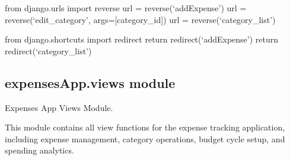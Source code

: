 \documentclass[letterpaper,10pt,english]{sphinxmanual}
\begin{document}
\begin{fulllineitems}
\begin{description}
\sphinxAtStartPar
from django.urls import reverse
url = reverse(‘addExpense’)
url = reverse(‘edit\_category’, args={[}category\_id{]})
url = reverse(‘category\_list’)

\sphinxAtStartPar
from django.shortcuts import redirect
return redirect(‘addExpense’)
return redirect(‘category\_list’)

\end{description}

\end{fulllineitems}



\subsection{expensesApp.views module}
\label{\detokenize{expensesApp:module-expensesApp.views}}\label{\detokenize{expensesApp:expensesapp-views-module}}
\sphinxAtStartPar
Expenses App Views Module.

\sphinxAtStartPar
This module contains all view functions for the expense tracking application,
including expense management, category operations, budget cycle setup,
and spending analytics.
\end{document}
